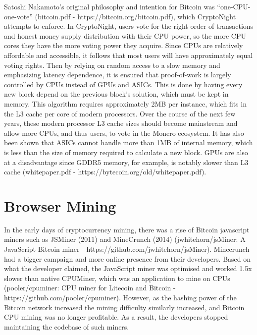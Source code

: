 Satoshi Nakamoto’s original philosophy and intention for Bitcoin was “one-CPU-one-vote” (bitcoin.pdf - https://bitcoin.org/bitcoin.pdf), which CryptoNight attempts to enforce. In CryptoNight, users vote for the right order of transactions and honest money supply distribution with their CPU power, so the more CPU cores they have the more voting power they acquire. Since CPUs are relatively affordable and accessible, it follows that most users will have approximately equal voting rights. Then by relying on random access to a slow memory and emphasizing latency dependence, it is ensured that proof-of-work is largely controlled by CPUs instead of GPUs and ASICs. This is done by having every new block depend on the previous block’s solution, which must be kept in memory. This algorithm requires approximately 2MB per instance, which fits in the L3 cache per core of modern processors. Over the course of the next few years, these modern processor L3 cache sizes should become mainstream and allow more CPUs, and thus users, to vote in the Monero ecosystem. It has also been shown that ASICs cannot handle more than 1MB of internal memory, which is less than the size of memory required to calculate a new block. GPUs are also at a disadvantage since GDDR5 memory, for example, is notably slower than L3 cache (whitepaper.pdf - https://bytecoin.org/old/whitepaper.pdf).  



\section{Browser Mining}

In the early days of cryptocurrency mining, there was a rise of Bitcoin javascript miners such as JSMiner (2011) and MineCrunch (2014) (jwhitehorn/jsMiner: A JavaScript Bitcoin miner - https://github.com/jwhitehorn/jsMiner). Minecrunch had a bigger campaign and more online presence from their developers. Based on what the developer claimed, the JavaScript miner was optimised and worked 1.5x slower than native CPUMiner, which was an application to mine on CPUs (pooler/cpuminer: CPU miner for Litecoin and Bitcoin - https://github.com/pooler/cpuminer). However, as the hashing power of the Bitcoin network increased the mining difficulty similarly increased, and Bitcoin CPU mining was no longer profitable. As a result, the developers stopped maintaining the codebase of such miners.


